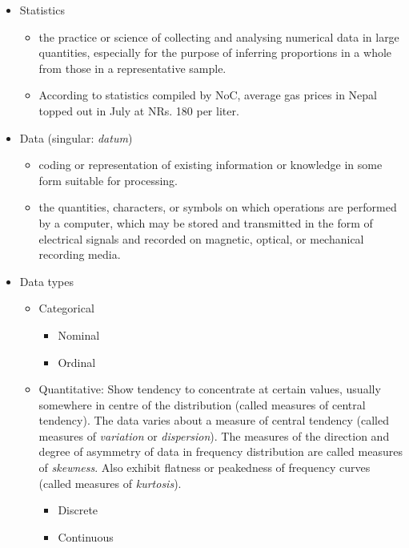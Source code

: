 \documentclass[
  ignorenonframetext,
  aspectratio=169]{beamer}
\begin{document}
\begin{frame}{}
\protect\hypertarget{section-1}{}
\begin{itemize}
\small
\item \alert{Statistics}
  \begin{itemize}
  \footnotesize
  \item the practice or science of collecting and analysing numerical data in large quantities, especially for the purpose of inferring proportions in a whole from those in a representative sample.
  \item According to statistics compiled by NoC, average gas prices in Nepal topped out in July at NRs. 180 per liter.
  \end{itemize}
\item Data (singular: \textit{datum})
  \begin{itemize}
  \footnotesize
  \item coding or representation of existing information or knowledge in some form suitable for processing.
  \item the quantities, characters, or symbols on which operations are performed by a computer, which may be stored and transmitted in the form of electrical signals and recorded on magnetic, optical, or mechanical recording media.
  \end{itemize}
\item Data types
  \begin{itemize}
  \footnotesize
  \item Categorical
    \begin{itemize}
    \scriptsize
    \item Nominal
    \item Ordinal
    \end{itemize}
  \item Quantitative: Show tendency to concentrate at certain values, usually somewhere in centre of the distribution (called measures of central tendency). The data varies about a measure of central tendency (called measures of \textit{variation} or \textit{dispersion}). The measures of the direction and degree of asymmetry of data in frequency distribution are called measures of \textit{skewness}. Also exhibit flatness or peakedness of frequency curves (called measures of \textit{kurtosis}).
    \begin{itemize}
    \scriptsize
    \item Discrete
    \item Continuous
    \end{itemize}
  \end{itemize}
\end{itemize}
\end{frame}
\end{document}
